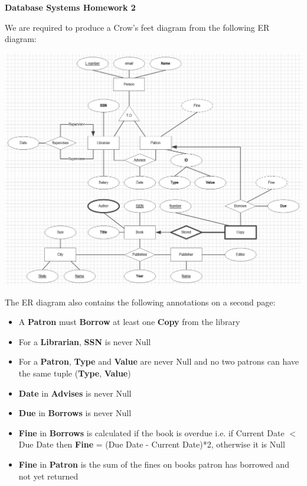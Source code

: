 \documentclass[11pt]{article}
\begin{document}
\begin{center}
\textbf{Database Systems Homework 2}
\end{center}

We are required to produce a Crow's feet diagram from the following ER diagram:
\begin{center}
    \includegraphics[width=180mm]{problem.jpg}
\end{center}
The ER diagram also contains the following annotations on a second page:
\begin{itemize}
    \item A \textbf{Patron} must \textbf{Borrow} at least one \textbf{Copy} from the library
    \item For a \textbf{Librarian}, \textbf{SSN} is never Null
    \item For a \textbf{Patron}, \textbf{Type} and \textbf{Value} are never Null and no two patrons can have the same tuple (\textbf{Type}, \textbf{Value})
    \item \textbf{Date} in \textbf{Advises} is never Null
    \item \textbf{Due} in \textbf{Borrows} is never Null
    \item \textbf{Fine} in \textbf{Borrows} is calculated if the book is overdue i.e. if Current Date $<$ Due Date then \textbf{Fine} = (Due Date - Current Date)*2, otherwise it is Null
    \item \textbf{Fine} in \textbf{Patron} is the sum of the fines on books patron has borrowed and not yet returned
\end{itemize}
\end{document}
